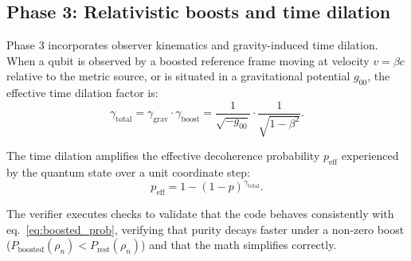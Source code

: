 \subsection{Phase 3: Relativistic boosts and time dilation}
Phase 3 incorporates observer kinematics and gravity-induced time dilation. When a qubit is observed by a boosted reference frame moving at velocity $v = \beta c$ relative to the metric source, or is situated in a gravitational potential $g_{00}$, the effective time dilation factor is:
\begin{equation}
  \gamma_{\text{total}} = \gamma_{\text{grav}} \cdot \gamma_{\text{boost}} = \frac{1}{\sqrt{-g_{00}}} \cdot \frac{1}{\sqrt{1 - \beta^2}}.
\end{equation}

The time dilation amplifies the effective decoherence probability $p_{\text{eff}}$ experienced by the quantum state over a unit coordinate step:
\begin{equation}
  p_{\text{eff}} = 1 - (1 - p)^{\gamma_{\text{total}}}.
  \label{eq:boosted_prob}
\end{equation}

The verifier executes checks to validate that the code behaves consistently with eq.~\eqref{eq:boosted_prob}, verifying that purity decays faster under a non-zero boost ($P_{\text{boosted}}(\rho_n) < P_{\text{rest}}(\rho_n)$) and that the math simplifies correctly.

